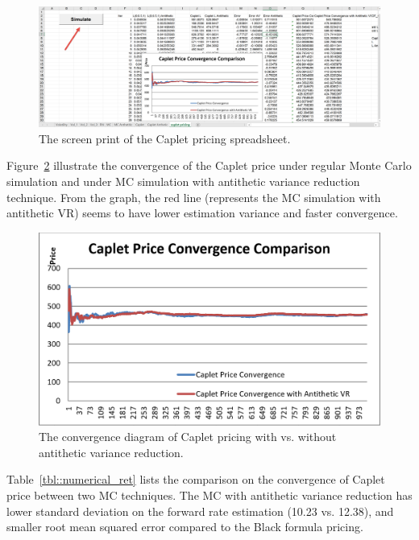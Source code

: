 \documentclass[a4paper,11pt] {article}
\begin{document}
\begin{center}
\begin{figure}
  \centering
  \includegraphics[scale=0.4]{spreadsheet.png}
  \caption{The screen print of the Caplet pricing spreadsheet.}\label{fig::scr_excel}
\end{figure}
\end{center}

Figure~\ref{fig::scr_conv} illustrate the convergence of the Caplet price under regular Monte Carlo simulation and under MC simulation with antithetic variance reduction technique. From the graph, the red line (represents the MC simulation with antithetic VR) seems to have lower estimation variance and faster convergence.

\begin{center}
\begin{figure}
  \centering
  \includegraphics[scale=0.5]{diagram.png}
  \caption{The convergence diagram of Caplet pricing with vs. without antithetic variance reduction.}\label{fig::scr_conv}
\end{figure}
\end{center}

Table~\ref{tbl::numerical_ret} lists the comparison on the convergence of Caplet price between two MC techniques. The MC with antithetic variance reduction has lower standard deviation on the forward rate estimation (10.23 vs. 12.38), and smaller root mean squared error compared to the Black formula pricing.
\end{document}
